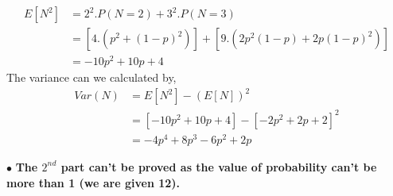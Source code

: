 \documentclass{article}
\begin{document}
\begin{enumerate}
\begin{enumerate}
\begin{align*}
            E[N^2] &= 2^2.P(N=2) + 3^2.P(N=3)\\
            &= \left[4.\left(p^2 + (1-p)^2\right)\right] + \left[9.\left(2p^2(1-p) + 2p(1-p)^2\right)\right]\\
            &= -10p^2 + 10p + 4
        \end{align*}
        The variance can we calculated by,
        \begin{align*}
            Var(N) &= E[N^2] - (E[N])^2\\
            &= \left[-10p^2 + 10p + 4\right] - \left[-2p^2 + 2p + 2\right]^2\\
            &= -4p^4 + 8p^3 - 6p^2 + 2p
        \end{align*}

        $\bullet$ \textbf{The \(2^{nd}\) part can't be proved as the value of probability can't be more than 1 (we are given 12).}
    \end{enumerate}


\end{enumerate}
\end{document}

